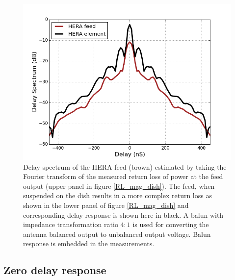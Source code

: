 \documentclass[twocolumn]{emulateapj}
\begin{document}
    \begin{figure}       
    \centering
    \includegraphics[width=\linewidth]{GB_reflectometry_part3/plot/ds_feed_dish.png}
    \caption{Delay spectrum of the HERA feed (brown) estimated by taking the Fourier transform of the measured return loss of power at the feed output (upper panel in figure \ref{RL_mag_dish}). The feed, when suspended on the dish results in a more complex return loss as shown in the lower panel of figure \ref{RL_mag_dish} and corresponding delay response is shown here in black. A balun with impedance transformation ratio $4:1$ is used for converting the antenna balanced output to unbalanced output voltage. Balun response is embedded in the measurements. }
    \label{ds_feed_on_dish_trans}
    \end{figure}
    

    
    \subsection{Zero delay response}
    
\end{document}
